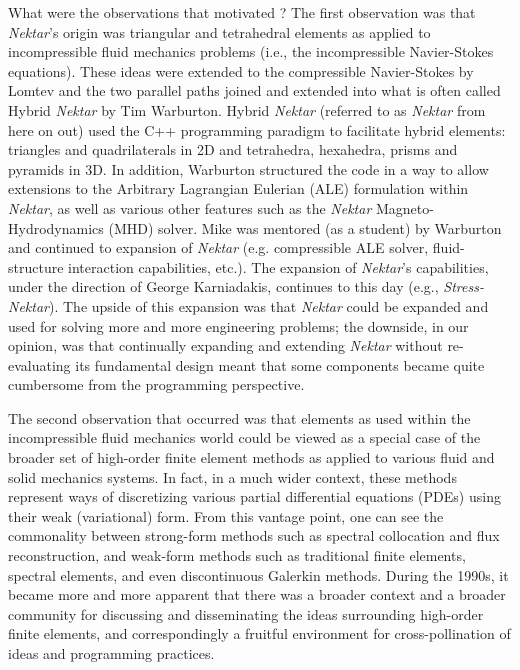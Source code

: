 What were the observations that motivated \nek{}?  The first observation was that \emph{Nektar}'s origin
was triangular and tetrahedral \shp{} elements as applied to incompressible fluid mechanics 
problems (i.e., the incompressible Navier-Stokes equations).  These ideas were extended to 
the compressible Navier-Stokes by Lomtev and the two parallel paths joined and extended into
what is often called Hybrid \emph{Nektar} by Tim Warburton. Hybrid \emph{Nektar} (referred to as \emph{Nektar} from
here on out) used the C++ programming paradigm to facilitate hybrid elements:  triangles and
quadrilaterals in 2D and tetrahedra, hexahedra, prisms and pyramids in 3D.   In addition, Warburton
structured the code in a way to allow extensions to the Arbitrary Lagrangian Eulerian (ALE) formulation
within \emph{Nektar}, as well as various other features such as the \emph{Nektar} Magneto-Hydrodynamics (MHD) solver.
Mike was mentored (as a student) by Warburton and continued to expansion of \emph{Nektar} (e.g. compressible
ALE solver, fluid-structure interaction capabilities, etc.).  The expansion of \emph{Nektar}'s capabilities, under
the direction of George Karniadakis, continues to this day (e.g., \emph{Stress-Nektar}).
The upside of this expansion was that \emph{Nektar} could
be expanded and used for solving more and more engineering problems; the downside, in our opinion, 
was that continually expanding and extending
\emph{Nektar} without re-evaluating its fundamental design meant that some components became quite 
cumbersome from the programming perspective.  

The second observation that occurred was that \shp{} elements as used within the incompressible
fluid mechanics world could be viewed as a special case of the broader set of high-order finite element methods
as applied to various fluid and solid mechanics systems.  In fact, in a much wider context, these methods
represent ways of discretizing various partial differential equations (PDEs) using their weak (variational) form.
From this vantage point, one can see the commonality between strong-form methods such as spectral collocation
and flux reconstruction, and weak-form methods such as traditional finite elements, spectral elements, and
even discontinuous Galerkin methods.  
During the 1990s, it became more and more apparent that there was a broader context and a broader
community for discussing and disseminating the ideas surrounding high-order finite elements, and 
correspondingly a fruitful environment for cross-pollination of ideas and programming practices.

